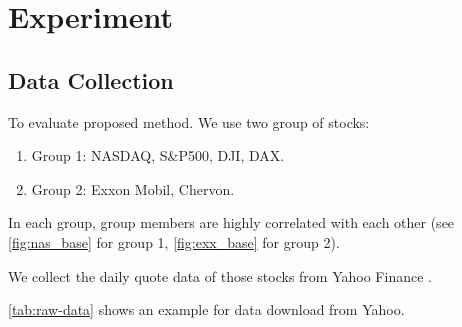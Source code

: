 \chapter{Experiment}
\label{ch:experiment}

\section{Data Collection}
To evaluate proposed method. We use two group of stocks:
\begin{enumerate}
	\item Group 1: NASDAQ, S\&P500, DJI, DAX.
	
	\item Group 2: Exxon Mobil, Chervon.
\end{enumerate}

In each group, group members are highly correlated with each other (see \autoref{fig:nas_base} for group 1, \autoref{fig:exx_base} for group 2).

\bigskip

We collect the daily quote data of those stocks from Yahoo Finance \cite{yf}.

\bigskip

\autoref{tab:raw-data} shows an example for data download from Yahoo.

